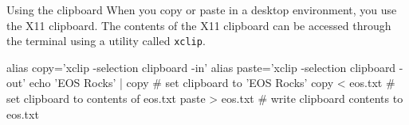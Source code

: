 \begin{block}{Using the clipboard}
  When you copy or paste in a desktop environment, you use the X11 clipboard. The contents of the X11 clipboard can be accessed through the terminal using a utility called \texttt{xclip}.
  \begin{indented}
    \begin{bashcode}
      alias copy='xclip -selection clipboard -in'
      alias paste='xclip -selection clipboard -out'
      echo 'EOS Rocks' | copy # set clipboard to 'EOS Rocks'
      copy < eos.txt # set clipboard to contents of eos.txt
      paste > eos.txt # write clipboard contents to eos.txt
    \end{bashcode}
  \end{indented}
\end{block}
